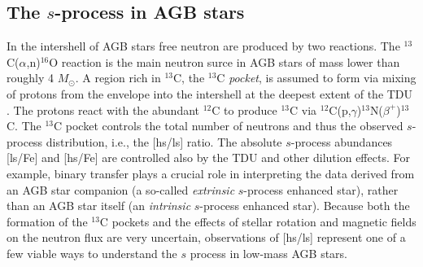 \documentclass{iau}
\newcommand{\msun}{\ensuremath{{M}_{\odot}}}
\begin{document}
\subsection{The $s$-process in AGB stars}

In the intershell of AGB stars free neutron are produced by two reactions. The 
$^{13}$C($\alpha$,n)$^{16}$O reaction is the main neutron surce in AGB stars of mass 
lower than roughly 4 \msun. A region rich in $^{13}$C, the $^{13}$C {\em pocket}, is 
assumed to form via mixing of protons from the envelope into the intershell at the 
deepest extent of the TDU \citep{gallino98,goriely00,lugaro03a,cristallo09}. The 
protons react with the abundant $^{12}$C to produce $^{13}$C via 
$^{12}$C(p,$\gamma$)$^{13}$N($\beta^+$)$^{13}$C. The $^{13}$C pocket controls the 
total number of neutrons and thus the observed $s$-process distribution, i.e., the 
[hs/ls] ratio. The 
absolute $s$-process abundances [ls/Fe] and [hs/Fe] are controlled also by the TDU and other 
dilution effects. For example, binary transfer plays a crucial role 
in interpreting the data derived from an AGB 
star companion (a so-called {\em extrinsic} $s$-process enhanced star), rather than an
AGB star itself (an {\em intrinsic} $s$-process enhanced star). Because both the formation 
of the $^{13}$C pockets and the effects of 
stellar rotation and magnetic fields on the 
neutron flux are very uncertain, observations of [hs/ls] represent one of a few viable 
ways to understand the $s$ process in low-mass AGB stars.
\end{document}
